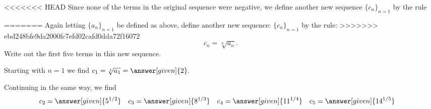 \documentclass{ximera}
\begin{document}
\begin{example}
<<<<<<< HEAD
Since none of the terms in the original sequence were negative, we define another new sequence $\{c_n\}_{n=1}$ by the rule

=======
Again letting $\{a_n\}_{n=1}$ be defined as above, define another new
sequence: $\{c_n\}_{n=1}$ by the rule:
>>>>>>> ebd248bfe9da2000fc7efd02cafd0dda72f16072
\[
c_n = \sqrt[n]{a_n} .
\]
Write out the first five terms in this new sequence.

\begin{explanation}
Starting with $n=1$ we find  $c_1 = \sqrt[1]{a_1} = \answer[given]{2}.$
      
Continuing in the same way, we find     
     \begin{align*}
      	c_2 &=  \answer[given]{5^{1/2}}  & 
	c_3 &= \answer[given]{8^{1/3}}   & 
	c_4 &= \answer[given]{11^{1/4}}   & 
	c_5 &=  \answer[given]{14^{1/5}}   
    \end{align*}
    
\end{explanation}
\end{example}
\end{document}
